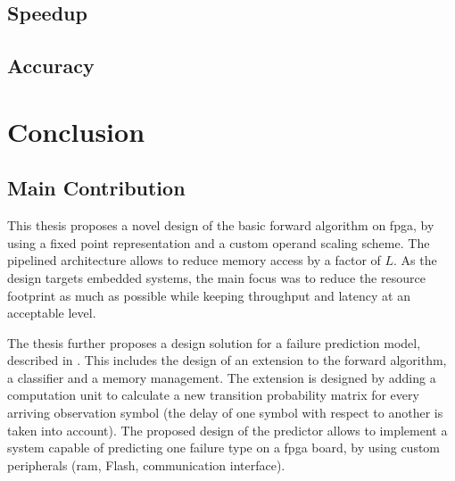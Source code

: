 \documentclass[mscthesis]{usiinfthesis}
\begin{document}
\section{Speedup}

\section{Accuracy}

\chapter{Conclusion}
\label{ch:conc}
\glsresetall %

\section{Main Contribution}
\label{ch:conc_ach}

This thesis proposes a novel design of the basic forward algorithm on
\gls{fpga}, by using a fixed point representation and a custom operand scaling
scheme. The pipelined architecture allows to reduce memory access by a factor
of $L$. As the design targets embedded systems, the main focus was to reduce
the resource footprint as much as possible while keeping throughput and latency
at an acceptable level.

The thesis further proposes a design solution for a failure prediction model,
described in \cite{salfner08}. This includes the design of an extension to the
forward algorithm, a classifier and a memory management. The extension is
designed by adding a computation unit to calculate a new transition
probability matrix for every arriving observation symbol (the delay of one
symbol with respect to another is taken into account). The proposed design
of the predictor allows to implement a system capable of predicting one failure
type on a \gls{fpga} board, by using custom peripherals (\gls{ram}, Flash,
communication interface).
\end{document}
